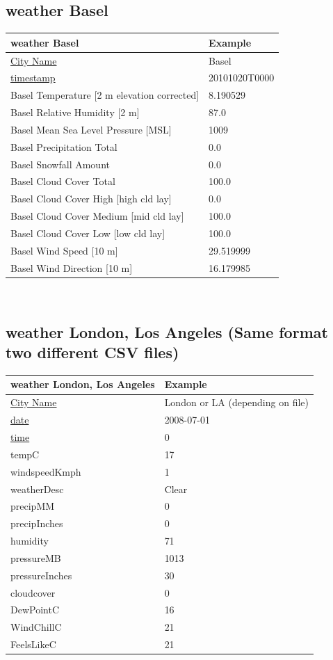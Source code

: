 \documentclass{article}
\begin{document}
\subsection{weather Basel}


\begin{tabular}{ |p{8cm}| p{5cm}|   }
\hline
 weather Basel & Example\\
 \hline
 \uline{City Name} & Basel
\\\uline{timestamp} & 20101020T0000
\\Basel Temperature [2 m elevation corrected]& 8.190529
\\Basel Relative Humidity [2 m] &87.0
\\Basel Mean Sea Level Pressure [MSL] &1009
\\Basel Precipitation Total& 0.0
\\Basel Snowfall Amount & 0.0
\\Basel Cloud Cover Total& 100.0
\\Basel Cloud Cover High [high cld lay]& 0.0
\\Basel Cloud Cover Medium [mid cld lay]&100.0
\\Basel Cloud Cover Low [low cld lay]& 100.0
\\Basel Wind Speed [10 m]& 29.519999
\\Basel Wind Direction [10 m]& 16.179985\\
 \hline
\end{tabular}\\



\subsection{weather London, Los Angeles (Same format two different CSV files)}


\begin{tabular}{ |p{8cm}| p{6cm}|  }
\hline
 weather London, Los Angeles & Example\\
 \hline
\uline{City Name} & London or LA (depending on file)
\\\uline{date} & 2008-07-01
\\\uline{time} & 0
\\tempC& 17
\\windspeedKmph& 1
\\weatherDesc& Clear
\\precipMM&0
\\precipInches& 0
\\humidity& 71
\\pressureMB& 1013
\\pressureInches& 30
\\cloudcover& 0
\\DewPointC& 16
\\WindChillC& 21
\\FeelsLikeC&21 \\
 \hline
\end{tabular}\\
\end{document}
